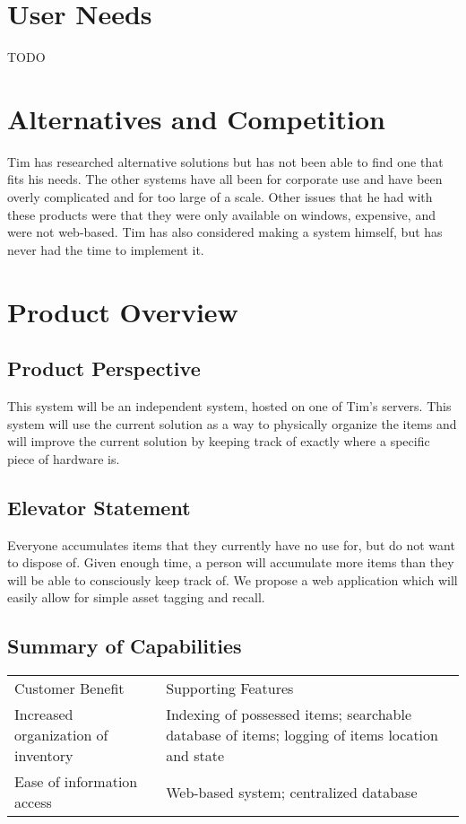 \documentclass{article}
\begin{document}
\section{User Needs}
TODO
\section{Alternatives and Competition}
Tim has researched alternative solutions but has not been able to find one that fits his needs.  The other systems have all been for corporate use and have been overly complicated and for too large of a scale.  Other issues that he had with these products were that they were only available on windows, expensive, and were not web-based.  Tim has also considered making a system himself, but has never had the time to implement it.

\section{Product Overview}
\subsection{Product Perspective}
This system will be an independent system, hosted on one of Tim’s servers.  This system will use the current solution as a way to physically organize the items and will improve the current solution by keeping track of exactly where a specific piece of hardware is.
\subsection{Elevator Statement}
Everyone accumulates items that they currently have no use for, but do not want to dispose of.  Given enough time, a person will accumulate more items than they will be able to consciously keep track of. We propose a web application which will easily allow for simple asset tagging and recall.

\subsection{Summary of Capabilities}
\begin{tabular}{ll}
Customer Benefit & Supporting Features\\
Increased organization of inventory & Indexing of possessed items; searchable database of items; logging of items location and state\\
Ease of information access & Web-based system; centralized database
\end{tabular}
\end{document}
